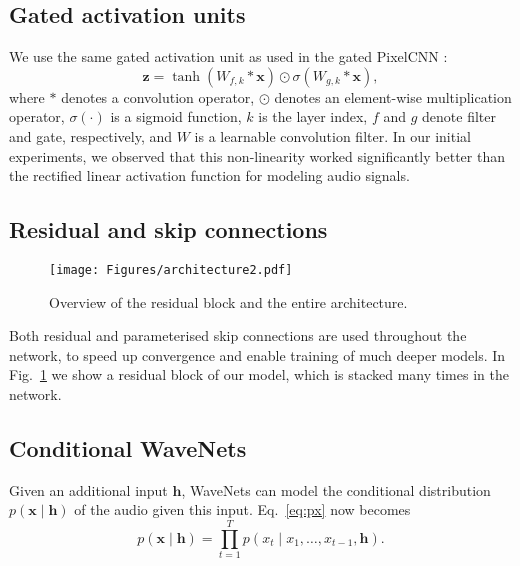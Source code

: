 \documentclass{article}
\renewcommand{\vec}{\mathbf}
\newcommand{\figref}[1]{Fig.~\ref{#1}}
\newcommand{\eqnref}[1]{Eq.~\eqref{#1}}
\begin{document}
\subsection{Gated activation units}

We use the same gated activation unit as used in the gated PixelCNN \citep{ConditionalPixelCNN}:
\begin{equation}
\vec{z} = \tanh \left(W_{f, k} \ast \vec{x}\right) \odot \sigma \left(W_{g, k} \ast \vec{x} \right), \label{eq:gated_activation}
\end{equation}
where $\ast$ denotes a convolution operator, $\odot$ denotes an element-wise multiplication operator, $\sigma(\cdot)$ is a sigmoid function, $k$ is the layer index, $f$ and $g$ denote filter and gate, respectively, and $W$ is a learnable convolution filter.
In our initial experiments, we observed that this non-linearity worked significantly better than the rectified linear activation function \citep{nair2010rectified} for modeling audio signals.

\subsection{Residual and skip connections}

\begin{figure}[h]
\centering
\texttt{[image: Figures/architecture2.pdf]}
\caption{Overview of the residual block and the entire architecture.}
\label{fig:architecture}
\end{figure}

Both residual \citep{he15deep} and parameterised skip connections are used throughout the network, to speed up convergence and enable training of much deeper models. In \figref{fig:architecture} we show a residual block of our model, which is stacked many times in the network.

\subsection{Conditional WaveNets}

Given an additional input $\vec{h}$, WaveNets can model the conditional distribution $p\left(\vec{x} \mid \vec{h}\right)$ of the audio given this input. \eqnref{eq:px} now becomes
\begin{equation}
p\left( \vec{x} \mid \vec{h} \right) = \prod_{t=1}^{T} p\left(x_t \mid x_1, \dots ,x_{t-1}, \vec{h}\right).
\label{eq:pxh}
\end{equation}
\end{document}
